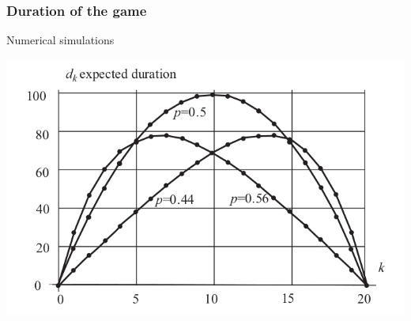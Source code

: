 \documentclass[spanish]{beamer}
\begin{document}
\begin{frame}
\frametitle{Duration of the game}
Numerical simulations
\begin{center}
\includegraphics[scale=0.4]{im2.png}
\end{center}

\end{frame}



\end{document}
